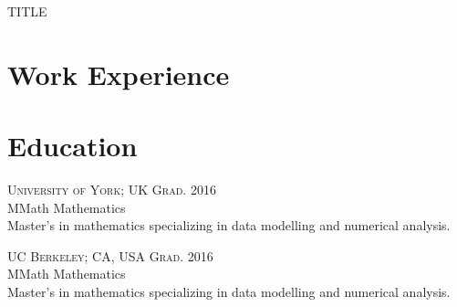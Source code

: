 \documentclass[10pt]{article}
\begin{document}
    \color{body}

        \begin{minipage}[t]{\textwidth}
            TITLE
        \end{minipage}

        \begin{minipage}[t]{0.6\textwidth}
            \vspace{0pt}

            \section{Work Experience}

            

        \end{minipage}
        \hfill
        \begin{minipage}[t]{0.35\textwidth}
            \vspace{0pt}

            \section{Education}
            {\small\raggedright
                {
                    \textsc{
                        University of York; UK
                        \hfill
                        {\raggedleft
                            Grad. 2016
                        }
                    }
                } \\

                \large{
                    MMath Mathematics
                } \\
                \normalsize{
                    Master's in mathematics specializing in data modelling and numerical analysis.
                } \\
                \vspace{10pt}
            }

            {\small\raggedright
                {
                    \textsc{
                        UC Berkeley; CA, USA
                        \hfill
                        {\raggedleft
                            Grad. 2016
                        }
                    }
                } \\

                \large{
                    MMath Mathematics
                } \\
                \normalsize{
                    Master's in mathematics specializing in data modelling and numerical analysis.
                } \\
            }
        \end{minipage}
\end{document}
